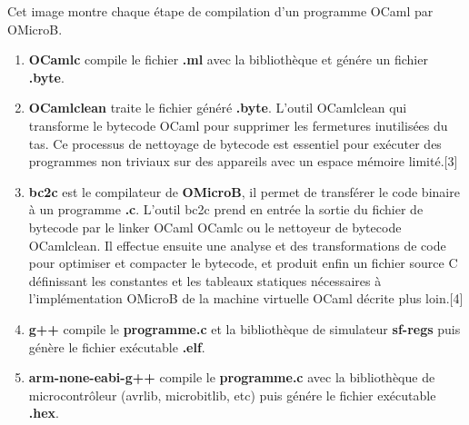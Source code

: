 \documentclass[14px]{article}
\begin{document}
\begin{figure}
\end{figure}

Cet image montre chaque étape de compilation d'un programme OCaml par OMicroB.
\begin{enumerate}
	\item \textbf{OCamlc} compile le fichier \textbf{.ml} avec la bibliothèque et génére un fichier \textbf{.byte}.
  \item \textbf{OCamlclean} traite le fichier généré \textbf{.byte}. L'outil OCamlclean qui transforme le bytecode OCaml pour supprimer les fermetures inutilisées du tas. Ce processus de nettoyage de bytecode est essentiel pour exécuter des programmes non triviaux sur des appareils avec un espace mémoire limité.[3]
 \item \textbf{bc2c} est le compilateur de \textbf{OMicroB}, il permet de transférer le code binaire à un programme \textbf{.c}. L'outil bc2c prend en entrée la sortie du fichier de bytecode par le linker OCaml OCamlc ou le nettoyeur de bytecode OCamlclean. Il effectue ensuite une analyse et des transformations de code pour optimiser et compacter le bytecode, et produit enfin un fichier source C définissant les constantes et les tableaux statiques nécessaires à l'implémentation OMicroB de la machine virtuelle OCaml décrite plus loin.[4]
	\item \textbf{g++} compile le \textbf{programme.c} et la bibliothèque de simulateur \textbf{sf-regs} puis génère le fichier exécutable \textbf{.elf}.
	\item \textbf{arm-none-eabi-g++} compile le \textbf{programme.c} avec la bibliothèque de microcontrôleur (avrlib, microbitlib, etc) puis génére le fichier exécutable \textbf{.hex}.\\
\end{enumerate}
\end{document}
